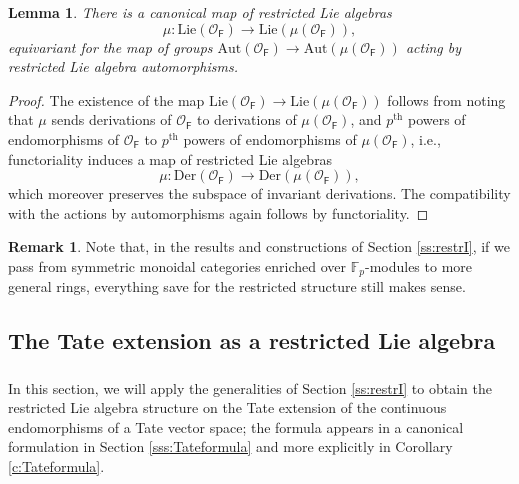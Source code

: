 \documentclass{amsart}
\newtheorem{Lem}[Thm]{Lemma}
\theoremstyle{definition}
\newtheorem{Rem}[Thm]{Remark}
\newcommand{\OOF}{\OO_{\mathsf{F}}}
\newcommand{\sss}{\subsubsection{}}
\newcommand{\OO}{\mathscr{O}}
\newcommand{\on}{\mathrm}
\numberwithin{equation}{section}
\begin{document}
\begin{Lem} \label{l:changecat}There is a canonical map of restricted Lie algebras $$\mu: \on{Lie}(\OOF) \rightarrow \on{Lie}(\mu(\OOF)),$$
equivariant for the map of groups $\on{Aut}(\OOF) \rightarrow \on{Aut}(\mu(\OOF))$ acting by restricted Lie algebra automorphisms. 
\end{Lem}



\begin{proof} The existence of the map $\on{Lie}(\OOF) \rightarrow \on{Lie}(\mu(\OOF))$ follows from noting that $\mu$ sends derivations of $\OOF$ to derivations of $\mu(\OOF)$, and $p^{\on{th}}$ powers of endomorphisms of $\OOF$ to $p^{\on{th}}$ powers of endomorphisms of $\mu(\OOF)$, i.e., functoriality induces a map of restricted Lie algebras $$\mu: \on{Der}(\OOF) \rightarrow \on{Der}(\mu(\OOF)),$$which moreover preserves the subspace of invariant derivations. The compatibility with the actions by automorphisms again follows by functoriality. 
\end{proof}








\begin{Rem} \label{Re_allgoodchar0} Note that, in the results and constructions of Section \ref{ss:restrI}, if we pass from symmetric monoidal categories enriched over $\mathbb{F}_p$-modules to more general rings, everything save for the restricted structure still makes sense. 
\end{Rem}


\subsection{The Tate extension as a restricted Lie algebra}

\sss In this section, we will apply the generalities of Section \ref{ss:restrI} to obtain the restricted Lie algebra structure on the Tate extension of the continuous endomorphisms of a Tate vector space; the  formula appears in a canonical formulation in Section \ref{sss:Tateformula} and more explicitly in Corollary \ref{c:Tateformula}. 
\end{document}
